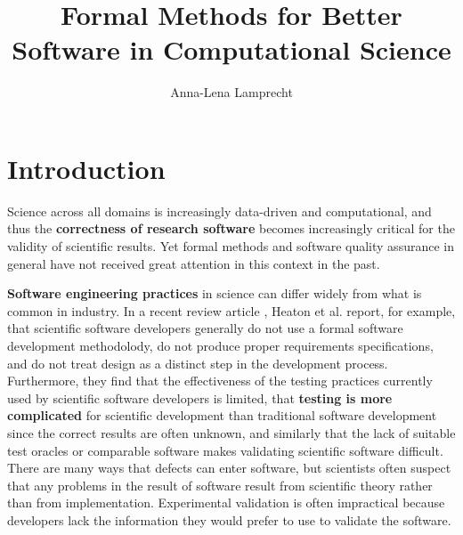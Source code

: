 \documentclass[sigplan,10pt,noacm]{acmart}
\begin{document}
\title{Formal Methods for Better Software in Computational Science}
\author{Anna-Lena Lamprecht}

\maketitle


\section{Introduction}


Science across all domains is increasingly data-driven and computational, and thus the \textbf{correctness of research software} becomes increasingly critical for the validity of scientific results. Yet formal methods and software quality assurance in general have not received great attention in this context in the past.

\textbf{Software engineering practices} in science can differ widely from what is common in industry. In a recent review article \cite{HeaCar2015}, Heaton et al. report, for example, that scientific software developers generally do not use a formal software development methodolody, do not produce proper requirements specifications, and do not treat design as a distinct step in the development process. Furthermore, they find that the effectiveness of the testing practices currently used by scientific software developers is limited, that \textbf{testing is more complicated} for scientific development than traditional software development since the correct results are often unknown, and similarly that the lack of suitable test oracles or comparable software makes validating scientific software difficult. There are many ways that defects can enter software, but scientists often suspect that any problems in the result of software result from scientific theory rather than from implementation. Experimental validation is often impractical because developers lack the information they would prefer to use to validate the software. 
\end{document}

